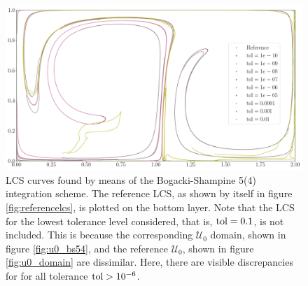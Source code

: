 \begin{figure}[htpb]
    \centering
    \includegraphics[width=0.9\linewidth]{figures/lcs_figures/rkbs54.pdf}
    \caption[LCS curves found by means of the Bogacki-Shampine 5(4) integration
    scheme]{
        LCS curves found by means of the Bogacki-Shampine 5(4) integration
        scheme. The reference LCS, as shown by itself in figure
        \ref{fig:referencelcs}, is plotted on the bottom layer. Note that
        the LCS for the lowest tolerance level considered, that is,
        $\textnormal{tol}=0.1$, is not included. This is because the
        corresponding $\mathcal{U}_{0}$ domain, shown in figure
        \ref{fig:u0_bs54}, and the reference $\mathcal{U}_{0}$, shown in figure
        \ref{fig:u0_domain} are dissimilar. Here, there are visible
        discrepancies for for all tolerance $\textnormal{tol}>10^{-6}$.}
    \label{fig:lcs_rkbs54}
\end{figure}
